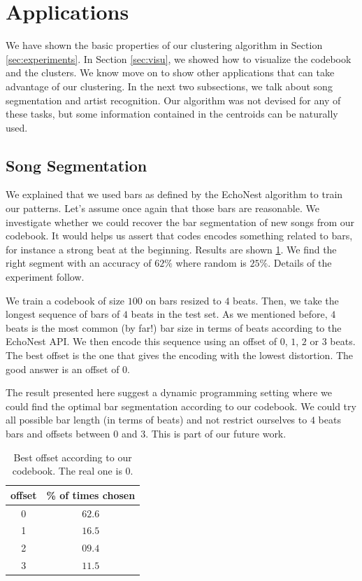 \documentclass{article}
\begin{document}
\section{Applications}\label{sec:exps2}
We have shown the basic properties of our clustering algorithm in
Section \ref{sec:experiments}. In Section \ref{sec:visu}, we showed
how to visualize the codebook and the clusters. We know move on to
show other applications that can take advantage of our clustering.
In the next two subsections, we talk about song segmentation and
artist recognition. Our algorithm was not devised for any of these tasks,
but some information contained in the centroids can be naturally used.

\subsection{Song Segmentation}
We explained that we used bars as defined by the EchoNest algorithm to
train our patterns. Let's assume once again that those bars are
reasonable. We investigate whether we could recover the bar segmentation
of new songs from our codebook. It would helps us assert that codes
encodes something related to bars, for instance a strong beat at the
beginning. Results are shown \ref{tab:offset}. We find the right segment
with an accuracy of $62\%$ where random is $25\%$. Details of the
experiment follow.

We train a codebook of size $100$ on bars resized to $4$ beats. Then,
we take the longest sequence of bars of $4$ beats in the test set.
As we mentioned before, $4$ beats is the most common (by far!) bar size
in terms of beats according to the EchoNest API. We then encode this
sequence using an offset of $0$, $1$, $2$ or $3$ beats. The best offset
is the one that gives the encoding with the lowest distortion. The
good answer is an offset of $0$.

The result presented here suggest a dynamic programming setting where
we could find the optimal bar segmentation according to our codebook. 
We could try
all possible bar length (in terms of beats) and not restrict ourselves
to $4$ beats bars and offsets between $0$ and $3$. This is part of
our future work.

\begin{table}
\begin{center}
\begin{tabular}{c|c}
offset & \% of times chosen \\ \hline
0 & $\mathbf{62.6}$\\
1 & $16.5$\\
2 & $09.4$\\
3 & $11.5$\\
\end{tabular}
\end{center}
\caption{\small{
Best offset according to our codebook. The real one is $0$.
}}
\label{tab:offset}
\end{table}
\end{document}
